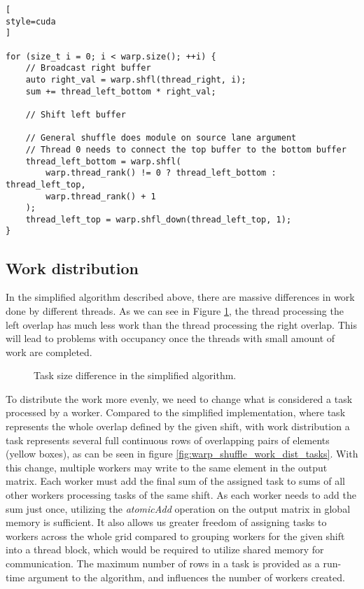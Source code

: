 \begin{lstlisting}[
style=cuda
]

for (size_t i = 0; i < warp.size(); ++i) {
	// Broadcast right buffer
	auto right_val = warp.shfl(thread_right, i);
	sum += thread_left_bottom * right_val;

	// Shift left buffer

	// General shuffle does module on source lane argument
	// Thread 0 needs to connect the top buffer to the bottom buffer
	thread_left_bottom = warp.shfl(
		warp.thread_rank() != 0 ? thread_left_bottom : thread_left_top,
		warp.thread_rank() + 1
	);
	thread_left_top = warp.shfl_down(thread_left_top, 1);
}
\end{lstlisting}


\subsection{Work distribution}
\label{sec:warp_shuffle_work_dist}

In the simplified algorithm described above, there are massive differences in work done by different threads. As we can see in Figure \ref{fig:warp_shuffle_work_difference}, the thread processing the left overlap has much less work than the thread processing the right overlap. This will lead to problems with occupancy once the threads with small amount of work are completed.

\begin{figure}[ht]
	\centering
	\def\svgwidth{0.6\textwidth}
	
	\caption{Task size difference in the simplified algorithm.}
	\label{fig:warp_shuffle_work_difference}
\end{figure}

To distribute the work more evenly, we need to change what is considered a task processed by a worker. Compared to the simplified implementation, where task represents the whole overlap defined by the given shift, with work distribution a task represents several full continuous rows of overlapping pairs of elements (yellow boxes), as can be seen in figure \ref{fig:warp_shuffle_work_dist_tasks}. With this change, multiple workers may write to the same element in the output matrix. Each worker must add the final sum of the assigned task to sums of all other workers processing tasks of the same shift. As each worker needs to add the sum just once, utilizing the \textit{atomicAdd} operation on the output matrix in global memory is sufficient. It also allows us greater freedom of assigning tasks to workers across the whole grid compared to grouping workers for the given shift into a thread block, which would be required to utilize shared memory for communication. The maximum number of rows in a task is provided as a run-time argument to the algorithm, and influences the number of workers created.

